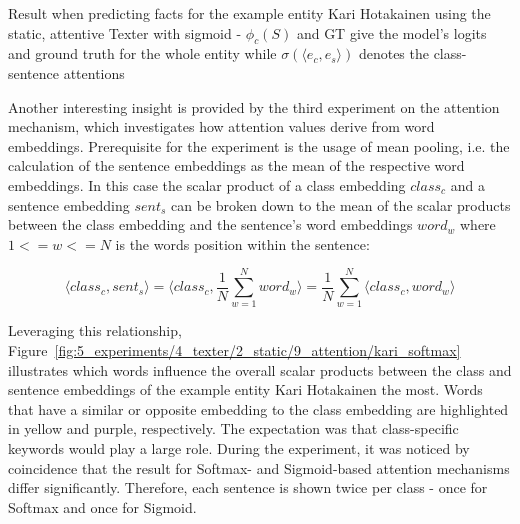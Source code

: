\begin{table}[h]
    \centering
    
    \caption{Result when predicting facts for the example entity Kari Hotakainen using the static, attentive Texter with sigmoid - $\phi_c(S)$ and GT give the model's logits and ground truth for the whole entity while $\sigma(\langle e_c, e_s \rangle)$ denotes the class-sentence attentions}
    \label{tab:5_experiments/4_texter/2_static/9_attention/kari}
\end{table}

Another interesting insight is provided by the third experiment on the attention mechanism, which investigates how attention values derive from word embeddings. Prerequisite for the experiment is the usage of mean pooling, i.e. the calculation of the sentence embeddings as the mean of the respective word embeddings. In this case the scalar product of a class embedding $class_c$ and a sentence embedding $sent_s$ can be broken down to the mean of the scalar products between the class embedding and the sentence's word embeddings $word_w$ where $1 <= w <= N$ is the words position within the sentence:

\[
    \langle class_c, sent_s \rangle
    = \langle class_c, \frac{1}{N} \sum_{w=1}^N word_w \rangle
    = \frac{1}{N} \sum_{w=1}^N \langle class_c, word_w \rangle
\]

Leveraging this relationship, Figure~\ref{fig:5_experiments/4_texter/2_static/9_attention/kari_softmax} illustrates which words influence the overall scalar products between the class and sentence embeddings of the example entity Kari Hotakainen the most. Words that have a similar or opposite embedding to the class embedding are highlighted in yellow and purple, respectively. The expectation was that class-specific keywords would play a large role. During the experiment, it was noticed by coincidence that the result for Softmax- and Sigmoid-based attention mechanisms differ significantly. Therefore, each sentence is shown twice per class - once for Softmax and once for Sigmoid.

